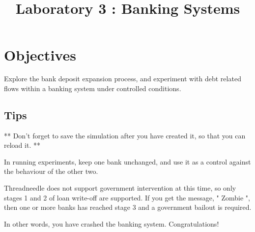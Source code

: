 \documentclass{article}
\title{Laboratory 3 : Banking Systems}
\begin{document}
\maketitle %



\section*{\centering Objectives}
Explore the bank deposit expansion process, and
experiment with debt related flows within a banking system under 
controlled conditions.
\subsection*{Tips}
** Don't forget to save the simulation after you have created it, so that
you can reload it. **

In running experiments, keep one bank unchanged, and use it as a control
against the behaviour of the other two.

Threadneedle does not support government intervention at this time, so only
stages 1 and 2 of loan write-off are supported. If you get the message,
"  Zombie ", then one or more banks has reached stage 3 and a government 
bailout is required.
\par
In other words, you have crashed the banking system. Congratulations!


 
\end{document}
